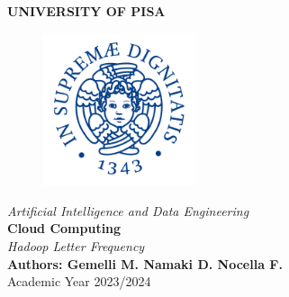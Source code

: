 \begin{titlepage}
    \centering
    \vspace*{\fill}
    {\LARGE \textbf{UNIVERSITY OF PISA}}\\[0.5cm]
    \begin{figure}[h]
        \centering
        \includegraphics[width=0.4\textwidth]{media/universita-di-pisa-logo.png} 
    \end{figure}
    {\Large \textit{Artificial Intelligence and Data Engineering}}\\[1.5cm]
    {\LARGE \textbf{Cloud Computing}}\\[1cm]
    {\Large \textit{Hadoop Letter Frequency}}\\[8cm]
    {\large \textbf{Authors: Gemelli M. Namaki D. Nocella F.}}\\[0.5cm]
    {\large Academic Year 2023/2024}
    \vspace*{\fill}
\end{titlepage}
